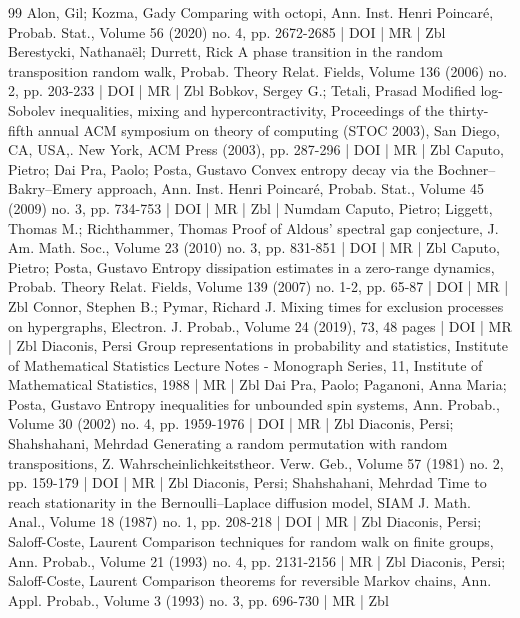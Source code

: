 \begin{thebibliography}{99}
Alon, Gil; Kozma, Gady Comparing with octopi, Ann. Inst. Henri Poincaré, Probab. Stat., Volume 56 (2020) no. 4, pp. 2672-2685 | DOI | MR | Zbl
Berestycki, Nathanaël; Durrett, Rick A phase transition in the random transposition random walk, Probab. Theory Relat. Fields, Volume 136 (2006) no. 2, pp. 203-233 | DOI | MR | Zbl
Bobkov, Sergey G.; Tetali, Prasad Modified log-Sobolev inequalities, mixing and hypercontractivity, Proceedings of the thirty-fifth annual ACM symposium on theory of computing (STOC 2003), San Diego, CA, USA,. New York, ACM Press (2003), pp. 287-296 | DOI | MR | Zbl
Caputo, Pietro; Dai Pra, Paolo; Posta, Gustavo Convex entropy decay via the Bochner–Bakry–Emery approach, Ann. Inst. Henri Poincaré, Probab. Stat., Volume 45 (2009) no. 3, pp. 734-753 | DOI | MR | Zbl | Numdam
Caputo, Pietro; Liggett, Thomas M.; Richthammer, Thomas Proof of Aldous’ spectral gap conjecture, J. Am. Math. Soc., Volume 23 (2010) no. 3, pp. 831-851 | DOI | MR | Zbl
Caputo, Pietro; Posta, Gustavo Entropy dissipation estimates in a zero-range dynamics, Probab. Theory Relat. Fields, Volume 139 (2007) no. 1-2, pp. 65-87 | DOI | MR | Zbl
Connor, Stephen B.; Pymar, Richard J. Mixing times for exclusion processes on hypergraphs, Electron. J. Probab., Volume 24 (2019), 73, 48 pages | DOI | MR | Zbl
Diaconis, Persi Group representations in probability and statistics, Institute of Mathematical Statistics Lecture Notes - Monograph Series, 11, Institute of Mathematical Statistics, 1988 | MR | Zbl
Dai Pra, Paolo; Paganoni, Anna Maria; Posta, Gustavo Entropy inequalities for unbounded spin systems, Ann. Probab., Volume 30 (2002) no. 4, pp. 1959-1976 | DOI | MR | Zbl
Diaconis, Persi; Shahshahani, Mehrdad Generating a random permutation with random transpositions, Z. Wahrscheinlichkeitstheor. Verw. Geb., Volume 57 (1981) no. 2, pp. 159-179 | DOI | MR | Zbl
Diaconis, Persi; Shahshahani, Mehrdad Time to reach stationarity in the Bernoulli–Laplace diffusion model, SIAM J. Math. Anal., Volume 18 (1987) no. 1, pp. 208-218 | DOI | MR | Zbl
Diaconis, Persi; Saloff-Coste, Laurent Comparison techniques for random walk on finite groups, Ann. Probab., Volume 21 (1993) no. 4, pp. 2131-2156 | MR | Zbl
Diaconis, Persi; Saloff-Coste, Laurent Comparison theorems for reversible Markov chains, Ann. Appl. Probab., Volume 3 (1993) no. 3, pp. 696-730 | MR | Zbl

\end{thebibliography}
